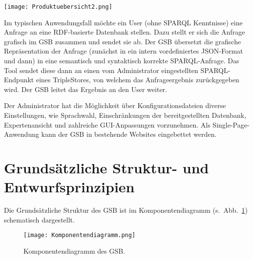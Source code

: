 \begin{SCfigure}[20][htbp]%
\texttt{[image: Produktuebersicht2.png]}
\caption{Beziehung des GSB zu Anwender, Datenbank und Administration.}
\label{fig01}
\end{SCfigure}

Im typischen Anwendungsfall möchte ein User (ohne SPARQL Kenntnisse)
eine Anfrage an eine RDF-basierte Datenbank stellen. 
Dazu stellt er sich die Anfrage grafisch im GSB zusammen und sendet
sie ab. Der GSB übersetzt die grafische Repräsentation der Anfrage
(zunächst in ein intern vordefiniertes JSON-Format und dann) in eine
semantisch und syntaktisch korrekte SPARQL-Anfrage. 
Das Tool sendet diese dann an einen vom Administrator eingestellten
SPARQL-Endpunkt eines TripleStores, von welchem das Anfrageergebnis
zurückgegeben wird. Der GSB leitet das Ergebnis an den User weiter.

Der Administrator hat die Möglichkeit über Konfigurationsdateien
diverse Einstellungen, wie Sprachwahl, Einschränkungen der
bereitgestellten Datenbank, Expertenansicht und zahlreiche
GUI-Anpassungen vorzunehmen.
Als Single-Page-Anwendung kann der GSB in bestehende Websites eingebettet werden.


\section{Grundsätzliche Struktur- und Entwurfsprinzipien}

Die Grundsätzliche Struktur des GSB ist im Komponentendiagramm
(s.~Abb.~\ref{fig02}) schematisch dargestellt.

\begin{figure}[tbp]%
\texttt{[image: Komponentendiagramm.png]}
\caption{Komponentendiagramm des GSB.}
\label{fig02}
\end{figure}


